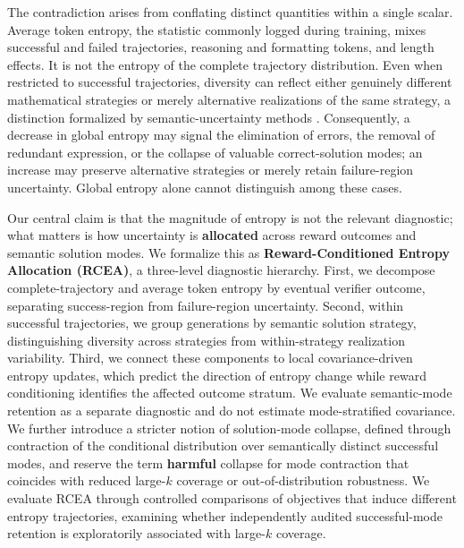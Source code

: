 \documentclass[letterpaper]{article} %
\begin{document}
The contradiction arises from conflating distinct quantities within a single scalar. Average token entropy, the statistic commonly logged during training, mixes successful and failed trajectories, reasoning and formatting tokens, and length effects. It is not the entropy of the complete trajectory distribution. Even when restricted to successful trajectories, diversity can reflect either genuinely different mathematical strategies or merely alternative realizations of the same strategy, a distinction formalized by semantic-uncertainty methods \citep{kuhn2023semanticuncertainty,farquhar2024semanticentropy}. Consequently, a decrease in global entropy may signal the elimination of errors, the removal of redundant expression, or the collapse of valuable correct-solution modes; an increase may preserve alternative strategies or merely retain failure-region uncertainty. Global entropy alone cannot distinguish among these cases.

Our central claim is that the magnitude of entropy is not the relevant diagnostic; what matters is how uncertainty is \textbf{allocated} across reward outcomes and semantic solution modes. We formalize this as \textbf{Reward-Conditioned Entropy Allocation (RCEA)}, a three-level diagnostic hierarchy. First, we decompose complete-trajectory and average token entropy by eventual verifier outcome, separating success-region from failure-region uncertainty. Second, within successful trajectories, we group generations by semantic solution strategy, distinguishing diversity across strategies from within-strategy realization variability. Third, we connect these components to local covariance-driven entropy updates, which predict the direction of entropy change while reward conditioning identifies the affected outcome stratum. We evaluate semantic-mode retention as a separate diagnostic and do not estimate mode-stratified covariance. We further introduce a stricter notion of solution-mode collapse, defined through contraction of the conditional distribution over semantically distinct successful modes, and reserve the term \textbf{harmful} collapse for mode contraction that coincides with reduced large-$k$ coverage or out-of-distribution robustness. We evaluate RCEA through controlled comparisons of objectives that induce different entropy trajectories, examining whether independently audited successful-mode retention is exploratorily associated with large-$k$ coverage.
\end{document}
